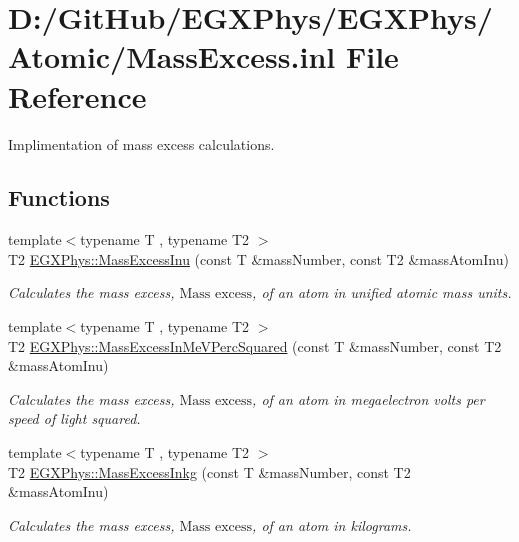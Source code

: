 \hypertarget{_mass_excess_8inl}{}\section{D\+:/\+Git\+Hub/\+E\+G\+X\+Phys/\+E\+G\+X\+Phys/\+Atomic/\+Mass\+Excess.inl File Reference}
\label{_mass_excess_8inl}


Implimentation of mass excess calculations.  


\subsection*{Functions}
\begin{DoxyCompactItemize}
\item 
{\footnotesize template$<$typename T , typename T2 $>$ }\\T2 \mbox{\hyperlink{group___e_g_x_phys-_mass_excess_ga61c6f557bd742126c0c76e88cf7740ad}{E\+G\+X\+Phys\+::\+Mass\+Excess\+Inu}} (const T \&mass\+Number, const T2 \&mass\+Atom\+Inu)
\begin{DoxyCompactList}\small\item\em Calculates the mass excess, $\text{Mass excess}$, of an atom in unified atomic mass units. \end{DoxyCompactList}\item 
{\footnotesize template$<$typename T , typename T2 $>$ }\\T2 \mbox{\hyperlink{group___e_g_x_phys-_mass_excess_ga99a93b88df3425b7a153c32c05fa5a88}{E\+G\+X\+Phys\+::\+Mass\+Excess\+In\+Me\+V\+Perc\+Squared}} (const T \&mass\+Number, const T2 \&mass\+Atom\+Inu)
\begin{DoxyCompactList}\small\item\em Calculates the mass excess, $\text{Mass excess}$, of an atom in megaelectron volts per speed of light squared. \end{DoxyCompactList}\item 
{\footnotesize template$<$typename T , typename T2 $>$ }\\T2 \mbox{\hyperlink{group___e_g_x_phys-_mass_excess_gab72a3640886092be8b9c9662020a2306}{E\+G\+X\+Phys\+::\+Mass\+Excess\+Inkg}} (const T \&mass\+Number, const T2 \&mass\+Atom\+Inu)
\begin{DoxyCompactList}\small\item\em Calculates the mass excess, $\text{Mass excess}$, of an atom in kilograms. \end{DoxyCompactList}\item 

\end{DoxyCompactItemize}

